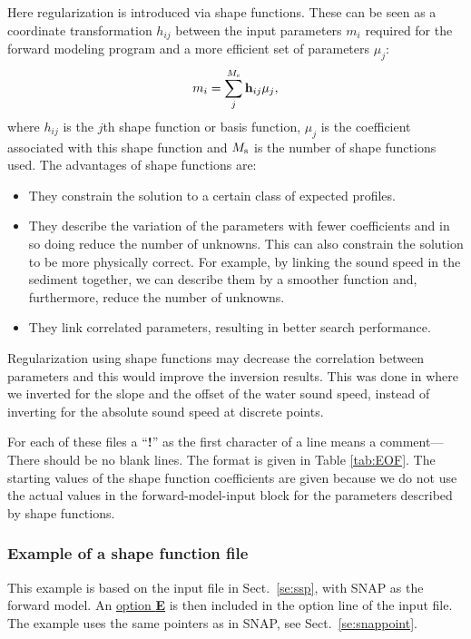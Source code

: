 \documentclass{saclantc}
\begin{document}
Here regularization is introduced via shape functions. These can be 
seen as a coordinate transformation $h_{ij}$ between the input
parameters $m_i$ required for the forward modeling
program and a more efficient set of parameters $\mu_j$:
\begin{equation}
 {m_i}= \sum_j^{M_{\rm s}} {\bf h}_{ij} \mu_j,
\label{eq:shp}
\end{equation}
where $ { h}_{ij}$ is the $j$th shape function or basis function,
$\mu_j$ is the coefficient
associated with this shape function and $M_{\rm s}$ is the number of shape functions
used. The advantages of shape functions are:
\begin{itemize}
\item They constrain the solution to a certain class of 
expected profiles.
\item They describe the variation of the parameters with 
fewer coefficients and in so doing reduce the number of unknowns. This can
also constrain the solution to be more physically correct. For example,
by linking the sound speed in the sediment together, we can
describe them by a smoother function and, furthermore, reduce the number of unknowns. 
\item They link correlated  parameters, resulting in  better search 
performance.
\end{itemize}

Regularization using shape functions may 
decrease the correlation between parameters and this would improve the inversion
results. This was done in \cite{gerstoft:jca94} where we 
inverted for the slope 
and the offset of the water sound speed, instead of
inverting for  the absolute sound speed at discrete points. 

For each of these files a ``{\bf !}'' as the first character of a line  means
a comment--- There should be no blank lines.
The format is given in Table  \ref{tab:EOF}.
The starting values of the shape function coefficients are given because we do not
use the actual values in the forward-model-input block for the parameters
described by shape functions.



\subsubsection{Example of a shape function file}
This example is based on the  input file in Sect.\ \ref{se:ssp},
with {\sf SNAP} as the forward model. An \underline{option {\bf E}} is then included in the option line of
the input file. The example uses the same pointers as in {\sf SNAP}, see Sect.\
\ref{se:snappoint}.
\end{document}
